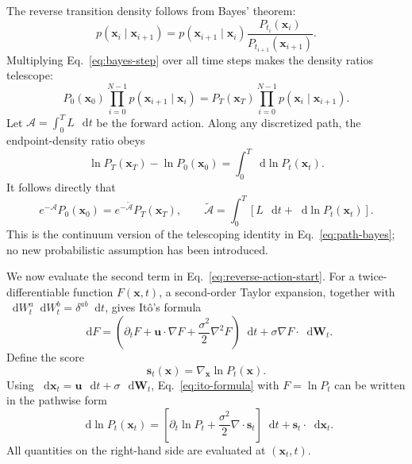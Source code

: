 \documentclass[11pt]{article}
\newcommand{\vct}[1]{\bm{#1}}
\newcommand{\dd}{\mathop{}\!\mathrm{d}}
\begin{document}
The reverse transition density follows from Bayes' theorem:
\begin{equation}
    p(\vct{x}_i\mid\vct{x}_{i+1})
    =p(\vct{x}_{i+1}\mid\vct{x}_i)
    \frac{P_{t_i}(\vct{x}_i)}{P_{t_{i+1}}(\vct{x}_{i+1})}.
    \label{eq:bayes-step}
\end{equation}
Multiplying Eq.~\eqref{eq:bayes-step} over all time steps makes the density ratios
 telescope:
\begin{equation}
    P_0(\vct{x}_0)\prod_{i=0}^{N-1}
    p(\vct{x}_{i+1}\mid\vct{x}_i)
    =P_T(\vct{x}_T)\prod_{i=0}^{N-1}
    p(\vct{x}_i\mid\vct{x}_{i+1}).
    \label{eq:path-bayes}
\end{equation}
Let \(\mathcal{A}=\int_0^T L\,\dd t\) be the forward action. Along any
discretized path, the endpoint-density ratio obeys
\begin{equation}
    \ln P_T(\vct{x}_T)-\ln P_0(\vct{x}_0)
    =\int_0^T\dd\ln P_t(\vct{x}_t).
    \label{eq:endpoint-density-ratio}
\end{equation}
It follows directly that
\begin{equation}
    e^{-\mathcal{A}}P_0(\vct{x}_0)
    =e^{-\widetilde{\mathcal{A}}}P_T(\vct{x}_T),
    \qquad
    \widetilde{\mathcal{A}}
    =\int_0^T\left[L\,\dd t+\dd\ln P_t(\vct{x}_t)\right].
    \label{eq:reverse-action-start}
\end{equation}
This is the continuum version of the telescoping identity
in Eq.~\eqref{eq:path-bayes}; no new probabilistic assumption has been introduced.

We now evaluate the second term in Eq.~\eqref{eq:reverse-action-start}. For a
twice-differentiable function \(F(\vct{x},t)\), a second-order Taylor expansion,
together with \(\dd W_t^a\dd W_t^b=\delta^{ab}\dd t\), gives It\^{o}'s formula
\begin{equation}
    \dd F
    =\left(\partial_t F+\vct{u}\cdot\nabla F
    +\frac{\sigma^2}{2}\nabla^2F\right)\dd t
    +\sigma\nabla F\cdot\dd\vct{W}_t.
    \label{eq:ito-formula}
\end{equation}
Define the score
\begin{equation}
    \vct{s}_t(\vct{x})=\nabla_{\vct{x}}\ln P_t(\vct{x}).
    \label{eq:score-definition}
\end{equation}
Using \(\dd\vct{x}_t=\vct{u}\,\dd t+\sigma\,\dd\vct{W}_t\),
Eq.~\eqref{eq:ito-formula} with \(F=\ln P_t\) can be written in the pathwise
form
\begin{equation}
    \dd\ln P_t(\vct{x}_t)
    =\left[\partial_t\ln P_t
    +\frac{\sigma^2}{2}\nabla\cdot\vct{s}_t\right]\dd t
    +\vct{s}_t\cdot\dd\vct{x}_t.
    \label{eq:ito-log-density}
\end{equation}
All quantities on the right-hand side are evaluated at \((\vct{x}_t,t)\).
\end{document}
